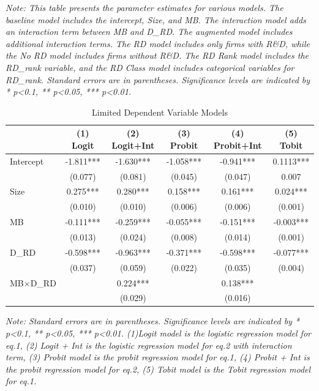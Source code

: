 \documentclass{article}
\begin{document}
\begin{table}[h!]
\begin{tabular}{lccccccc}
    \end{tabular}
    \newline
    \textit{Note: This table presents the parameter estimates for various models.
        The baseline model includes the intercept, Size, and MB.
        The interaction model adds an interaction term between MB and D\_RD.
        The augmented model includes additional interaction terms.
        The RD model includes only firms with R\&D, while the No RD model includes firms without R\&D.
        The RD Rank model includes the RD\_rank variable,
        and the RD Class model includes categorical variables for RD\_rank.
        Standard errors are in parentheses.
        Significance levels are indicated by * p\textless 0.1, ** p\textless 0.05, *** p\textless 0.01.}
\end{table}

\begin{table}[h!]
    \centering
    \caption{Limited Dependent Variable Models}
    \label{table:3}
    \begin{tabular}{lccccc}
        \toprule
                  & (1) Logit & (2) Logit+Int & (3) Probit & (4) Probit+Int & (5) Tobit \\
        \midrule
        Intercept & -1.811*** & -1.630***     & -1.058***  & -0.941***      & 0.1113*** \\
                  & (0.077)   & (0.081)       & (0.045)    & (0.047)        & 0.007     \\
        Size      & 0.275***  & 0.280***      & 0.158***   & 0.161***       & 0.024***  \\
                  & (0.010)   & (0.010)       & (0.006)    & (0.006)        & (0.001)   \\
        MB        & -0.111*** & -0.259***     & -0.055***  & -0.151***      & -0.003*** \\
                  & (0.013)   & (0.024)       & (0.008)    & (0.014)        & (0.001)   \\
        D\_RD     & -0.598*** & -0.963***     & -0.371***  & -0.598***      & -0.077*** \\
                  & (0.037)   & (0.059)       & (0.022)    & (0.035)        & (0.004)   \\
        MB×D\_RD  &           & 0.224***      &            & 0.138***       &           \\
                  &           & (0.029)       &            & (0.016)        &           \\
        \bottomrule
    \end{tabular}
    \newline
    \textit{Note: Standard errors are in parentheses. Significance levels are indicated by * p\textless 0.1, ** p\textless 0.05, *** p\textless 0.01.
        (1)Logit model is the logistic regression model for eq.1, (2) Logit + Int is the logistic regression model for eq.2 with interaction term,
        (3) Probit model is the probit regression model for eq.1, (4) Probit + Int is the probit regression model for eq.2,
        (5) Tobit model is the Tobit regression model for eq.1.}
\end{table}
\end{document}
